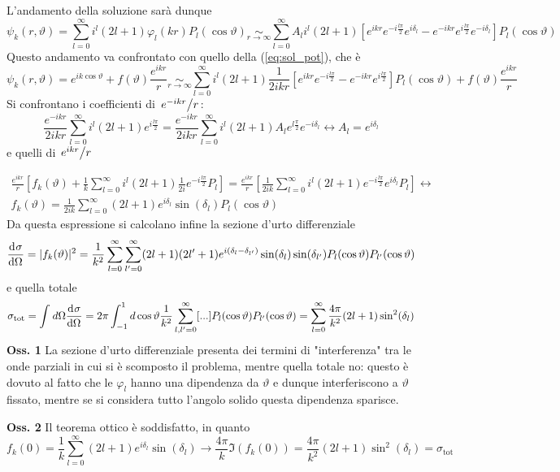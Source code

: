 L'andamento della soluzione sarà dunque
$$\psi_k(r,\vartheta) = \sum_{l=0}^{\infty}i^l(2l+1)\varphi_l(kr)P_l(\cos\vartheta)
\underset{r\to\infty}\sim
\sum_{l=0}^{\infty}A_li^l(2l+1)\left[e^{ikr}e^{-i\frac{l\pi}{2}}e^{i\delta_l}-
e^{-ikr}e^{i\frac{l\pi}{2}}e^{-i\delta_l}\right]P_l(\cos\vartheta)
$$
Questo andamento va confrontato con quello della (\ref{eq:sol_pot}), che è
$$\psi_k(r,\vartheta) = e^{ik\cos\vartheta}+f(\vartheta)\frac{e^{ikr}}{r}\underset{r\to\infty}\sim
\sum_{l=0}^{\infty}i^l(2l+1)\frac{1}{2ikr}\left[e^{ikr}e^{-i\frac{l\pi}{2}}-
e^{-ikr}e^{i\frac{l\pi}{2}}\right]P_l(\cos\vartheta)+f(\vartheta)\frac{e^{ikr}}{r}
$$
Si confrontano i coefficienti di $\flatfrac{e^{-ikr}}{r}$:
$$\frac{e^{-ikr}}{2ikr}\sum_{l=0}^{\infty}i^l(2l+1)
e^{i\frac{l\pi}{2}} = \frac{e^{-ikr}}{2ikr}\sum_{l=0}^{\infty}i^l(2l+1)A_le^{l\frac{\pi}{2}}
e^{-i\delta_l}\leftrightarrow A_l=e^{i\delta_l}$$
e quelli di $\flatfrac{e^{ikr}}{r}$

\begin{gather*}
\frac{e^{ikr}}{r}\left[f_k(\vartheta) +
\frac{1}{k}\sum_{l=0}^{\infty}i^l(2l+1)\frac{1}{2i}e^{-i\frac{l\pi}{2}}P_l\right] = 
\frac{e^{ikr}}{r}\left[\frac{1}{2ik}\sum_{l=0}^{\infty}i^l(2l+1)e^{-i\frac{l\pi}{2}}
e^{i\delta_l}P_l\right] \leftrightarrow \\
\boxed{
f_k(\vartheta)=\frac{1}{2ik}\sum_{l=0}^{\infty}(2l+1)e^{i\delta_l}\sin(\delta_l)P_l(\cos\vartheta)
}\end{gather*}
Da questa espressione si calcolano infine la sezione d'urto differenziale
$$\dv[]{\sigma}{\Omega}(\vartheta) = |f_k(\vartheta)|^2 = \frac{1}{k^2}
\sum_{l=0}^{\infty}\sum_{l'=0}^{\infty}(2l+1)(2l'+1)e^{i(\delta_l-\delta_{l'})}\sin(\delta_l)
\sin(\delta_{l'})P_l(\cos\vartheta)P_{l'}(\cos\vartheta)
$$
e quella totale
$$\sigma_\text{tot} = \int_{}^{}d\Omega\dv[]{\sigma}{\Omega} = 2\pi\int_{-1}^{1}d\cos\vartheta \frac{1}
{k^2} \sum_{l,l'=0}^{\infty}[...]P_l(\cos\vartheta)P_{l'}(\cos\vartheta) =
\sum_{l=0}^{\infty}\frac{4\pi}{k^2}(2l+1)\sin^2(\delta_l)$$
\textbf{Oss. 1} La sezione d'urto differenziale presenta dei termini di "interferenza" tra le
onde parziali in cui si è scomposto il problema, mentre quella totale no: questo è dovuto al fatto che
le $\varphi_l$ hanno una dipendenza da $\vartheta$ e dunque interferiscono a $\vartheta$ fissato,
mentre se si considera tutto l'angolo solido questa dipendenza sparisce.

\textbf{Oss. 2} Il teorema ottico è soddisfatto, in quanto
$$f_k(0) = \frac{1}{k}\sum_{l=0}^{\infty} (2l+1)e^{i\delta_l}\sin(\delta_l)\rightarrow
\frac{4\pi}{k}\Im(f_k(0)) = \frac{4\pi}{k^2}(2l+1)\sin^2(\delta_l)=\sigma_\text{tot}
$$

